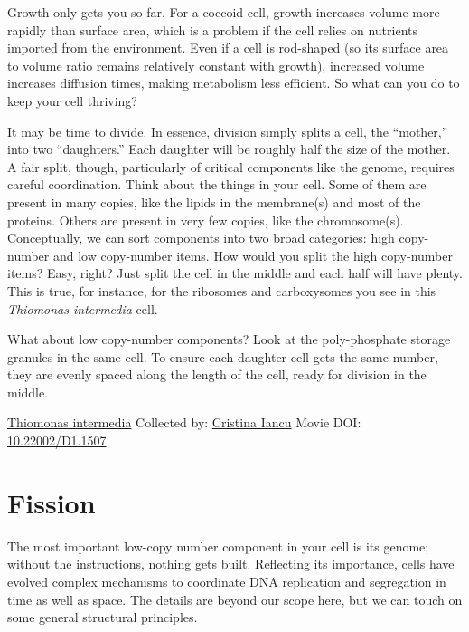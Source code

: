 \documentclass[]{tufte-book}
\begin{document}
Growth only gets you so far. For a coccoid cell, growth increases volume more rapidly than surface area, which is a problem if the cell relies on nutrients imported from the environment. Even if a cell is rod-shaped (so its surface area to volume ratio remains relatively constant with growth), increased volume increases diffusion times, making metabolism less efficient. So what can you do to keep your cell thriving?

It may be time to divide. In essence, division simply splits a cell, the ``mother,'' into two ``daughters.'' Each daughter will be roughly half the size of the mother. A fair split, though, particularly of critical components like the genome, requires careful coordination. Think about the things in your cell. Some of them are present in many copies, like the lipids in the membrane(s) and most of the proteins. Others are present in very few copies, like the chromosome(s). Conceptually, we can sort components into two broad categories: high copy-number and low copy-number items. How would you split the high copy-number items? Easy, right? Just split the cell in the middle and each half will have plenty. This is true, for instance, for the ribosomes and carboxysomes you see in this \emph{Thiomonas intermedia} cell.

What about low copy-number components? Look at the poly-phosphate storage granules in the same cell. To ensure each daughter cell gets the same number, they are evenly spaced along the length of the cell, ready for division in the middle.



\hypertarget{htmlwidget-9500fc4c820a19b724f0}{}

\label{fig:5-1}\protect\hyperlink{tree}{Thiomonas intermedia} Collected by: \protect\hyperlink{cristina_iancu}{Cristina Iancu} Movie DOI: \href{https://doi.org/10.22002/D1.1507}{10.22002/D1.1507}

\hypertarget{fission}{%
\section{Fission}\label{fission}}

The most important low-copy number component in your cell is its genome; without the instructions, nothing gets built. Reflecting its importance, cells have evolved complex mechanisms to coordinate DNA replication and segregation in time as well as space. The details are beyond our scope here, but we can touch on some general structural principles.
\end{document}
